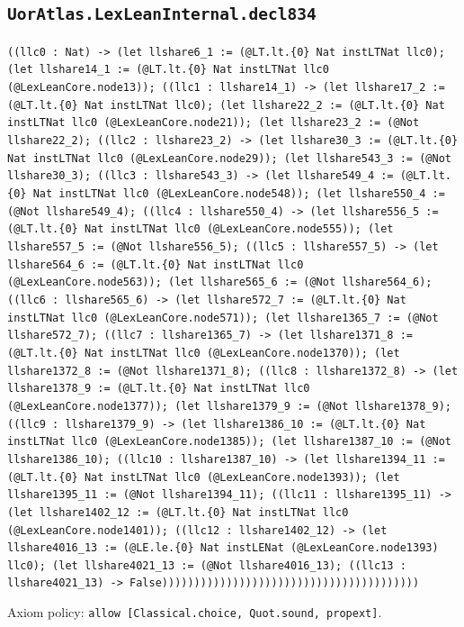 \documentclass[11pt]{article}
\begin{document}
\subsection*{\texttt{UorAtlas.LexLeanInternal.decl834}}
\noindent\texttt{((llc0 : Nat) -> (let llshare6\_1 := (@LT.lt.\{0\} Nat instLTNat llc0); (let llshare14\_1 := (@LT.lt.\{0\} Nat instLTNat llc0 (@LexLeanCore.node13)); ((llc1 : llshare14\_1) -> (let llshare17\_2 := (@LT.lt.\{0\} Nat instLTNat llc0); (let llshare22\_2 := (@LT.lt.\{0\} Nat instLTNat llc0 (@LexLeanCore.node21)); (let llshare23\_2 := (@Not llshare22\_2); ((llc2 : llshare23\_2) -> (let llshare30\_3 := (@LT.lt.\{0\} Nat instLTNat llc0 (@LexLeanCore.node29)); (let llshare543\_3 := (@Not llshare30\_3); ((llc3 : llshare543\_3) -> (let llshare549\_4 := (@LT.lt.\{0\} Nat instLTNat llc0 (@LexLeanCore.node548)); (let llshare550\_4 := (@Not llshare549\_4); ((llc4 : llshare550\_4) -> (let llshare556\_5 := (@LT.lt.\{0\} Nat instLTNat llc0 (@LexLeanCore.node555)); (let llshare557\_5 := (@Not llshare556\_5); ((llc5 : llshare557\_5) -> (let llshare564\_6 := (@LT.lt.\{0\} Nat instLTNat llc0 (@LexLeanCore.node563)); (let llshare565\_6 := (@Not llshare564\_6); ((llc6 : llshare565\_6) -> (let llshare572\_7 := (@LT.lt.\{0\} Nat instLTNat llc0 (@LexLeanCore.node571)); (let llshare1365\_7 := (@Not llshare572\_7); ((llc7 : llshare1365\_7) -> (let llshare1371\_8 := (@LT.lt.\{0\} Nat instLTNat llc0 (@LexLeanCore.node1370)); (let llshare1372\_8 := (@Not llshare1371\_8); ((llc8 : llshare1372\_8) -> (let llshare1378\_9 := (@LT.lt.\{0\} Nat instLTNat llc0 (@LexLeanCore.node1377)); (let llshare1379\_9 := (@Not llshare1378\_9); ((llc9 : llshare1379\_9) -> (let llshare1386\_10 := (@LT.lt.\{0\} Nat instLTNat llc0 (@LexLeanCore.node1385)); (let llshare1387\_10 := (@Not llshare1386\_10); ((llc10 : llshare1387\_10) -> (let llshare1394\_11 := (@LT.lt.\{0\} Nat instLTNat llc0 (@LexLeanCore.node1393)); (let llshare1395\_11 := (@Not llshare1394\_11); ((llc11 : llshare1395\_11) -> (let llshare1402\_12 := (@LT.lt.\{0\} Nat instLTNat llc0 (@LexLeanCore.node1401)); ((llc12 : llshare1402\_12) -> (let llshare4016\_13 := (@LE.le.\{0\} Nat instLENat (@LexLeanCore.node1393) llc0); (let llshare4021\_13 := (@Not llshare4016\_13); ((llc13 : llshare4021\_13) -> False))))))))))))))))))))))))))))))))))))))))}\par
\noindent Axiom policy: \texttt{allow [Classical.choice, Quot.sound, propext]}.\par
\end{document}
